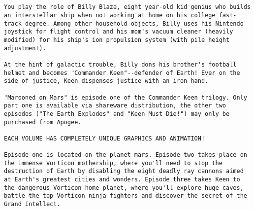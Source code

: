 
\begin{lstlisting}[breaklines=true,breakindent=0em]


You play the role of Billy Blaze, eight year-old kid genius who builds an interstellar ship when not working at home on his college fast-track degree. Among other household objects, Billy uses his Nintendo joystick for flight control and his mom's vacuum cleaner (heavily modified) for his ship's ion propulsion system (with pile height adjustment).

At the hint of galactic trouble, Billy dons his brother's football helmet and becomes "Commander Keen"--defender of Earth! Ever on the side of justice, Keen dispenses justice with an iron hand.

"Marooned on Mars" is episode one of the Commander Keen trilogy. Only part one is available via shareware distribution, the other two episodes ("The Earth Explodes" and "Keen Must Die!") may only be purchased from Apogee.

EACH VOLUME HAS COMPLETELY UNIQUE GRAPHICS AND ANIMATION!

Episode one is located on the planet mars. Episode two takes place on the immense Vorticon mothership, where you'll need to stop the destruction of Earth by disabling the eight deadly ray cannons aimed at Earth's greatest cities and wonders. Episode three takes Keen to the dangerous Vorticon home planet, where you'll explore huge caves, battle the top Vorticon ninja fighters and discover the secret of the Grand Intellect.
   \end{lstlisting}
